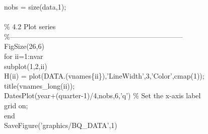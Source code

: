 \hspace{1mm}\hspace{5mm} nobs = size(data,1); \\ 
\hspace{1mm}\hspace{5mm}  \\ 
\hspace{1mm}\hspace{5mm} \textcolor{matlabgreen}{\% 4.2 Plot series }\\ 
\hspace{1mm}\hspace{5mm} \textcolor{matlabgreen}{\%--------------------------------------------------------------------------  }\\ 
\hspace{1mm}\hspace{5mm} FigSize(26,6) \\ 
\hspace{1mm}\hspace{5mm} \textcolor{matlabblue}{for} ii=1:nvar \\ 
\hspace{1mm}\hspace{5mm} \hspace{5mm} subplot(1,2,ii) \\ 
\hspace{1mm}\hspace{5mm} \hspace{5mm} H(ii) = plot(DATA.(vnames\{ii\}),\textcolor{matlabpurple}{'LineWidth'},3,\textcolor{matlabpurple}{'Color'},cmap(1)); \\ 
\hspace{1mm}\hspace{5mm} \hspace{5mm} title(vnames\_long(ii));  \\ 
\hspace{1mm}\hspace{5mm} \hspace{5mm} DatesPlot(year+(quarter-1)/4,nobs,6,\textcolor{matlabpurple}{'q'}) \textcolor{matlabgreen}{\% Set the x-axis label  }\\ 
\hspace{1mm}\hspace{5mm} \hspace{5mm} grid on;  \\ 
\hspace{1mm}\hspace{5mm} \textcolor{matlabblue}{end} \\ 
\hspace{1mm}\hspace{5mm} SaveFigure(\textcolor{matlabpurple}{'graphics/BQ\_DATA'},1) \\ 
